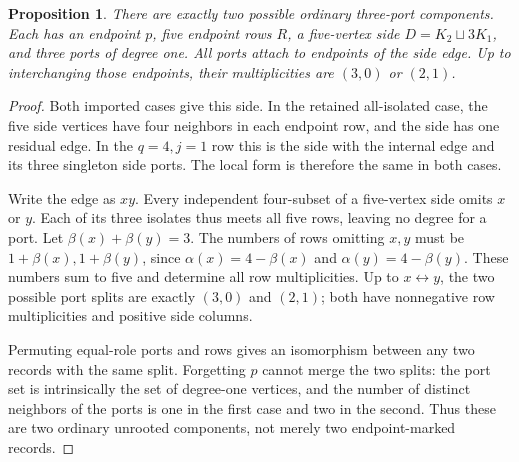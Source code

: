 \documentclass[11pt]{article}
\newtheorem{proposition}[theorem]{Proposition}
\newcommand{\sq}{\sqcup}
\begin{document}
\begin{proposition}\label{leftfour}
There are exactly two possible ordinary three-port components. Each has
an endpoint $p$, five endpoint rows $R$, a five-vertex side
$D=K_2\sq3K_1$, and three ports of degree one. All ports attach to
endpoints of the side edge. Up to interchanging those endpoints, their
multiplicities are $(3,0)$ or $(2,1)$.
\end{proposition}
\begin{proof}
Both imported cases give this side. In the retained all-isolated case,
the five side vertices have four neighbors in each endpoint row, and
the side has one residual edge. In the $q=4,j=1$ row this is the side
with the internal edge and its three singleton side ports. The local
form is therefore the same in both cases.

Write the edge as $xy$. Every independent four-subset of a five-vertex
side omits $x$ or $y$. Each of its three isolates thus meets all five
rows, leaving no degree for a port. Let $\beta(x)+\beta(y)=3$. The
numbers of rows omitting $x,y$ must be $1+\beta(x),1+\beta(y)$,
since $\alpha(x)=4-\beta(x)$ and $\alpha(y)=4-\beta(y)$.
These numbers sum to five and determine all row multiplicities.
Up to $x\leftrightarrow y$, the two possible port splits are exactly
$(3,0)$ and $(2,1)$; both have nonnegative row multiplicities and positive
side columns.

Permuting equal-role ports and rows gives an isomorphism between any
two records with the same split. Forgetting $p$ cannot merge the two
splits: the port set is intrinsically the set of degree-one vertices,
and the number of distinct neighbors of the ports is one in the first
case and two in the second. Thus these are two ordinary unrooted
components, not merely two endpoint-marked records.
\end{proof}
\end{document}
